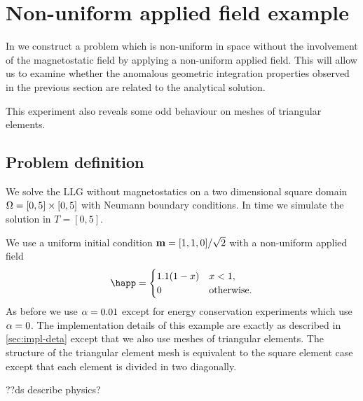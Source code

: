 \FloatBarrier
\section{Non-uniform applied field example}
\label{sec:non-uniform-applied}

In  we construct a problem which is non-uniform in space without the involvement of the magnetostatic field by applying a non-uniform applied field.
This will allow us to examine whether the anomalous geometric integration properties observed in the previous section are related to the analytical solution.

This experiment also reveals some odd behaviour on meshes of triangular elements.

\subsection{Problem definition}

We solve the LLG without magnetostatics on a two dimensional square domain $\Omega = [0,5] \times [0,5]$ with Neumann boundary conditions.
In time we simulate the solution in $T = [0, 5]$.

We use a uniform initial condition $\boldsymbol{\mathrm{m}} = [1, 1, 0]/\sqrt{2}$ with a non-uniform applied field
\begin{equation}
  \happ =
  \begin{cases}
    1.1 (1 -  x) & x  < 1, \\
    0 & \mathrm{otherwise}.
  \end{cases}
\end{equation}
As before we use $\alpha = 0.01$ except for energy conservation experiments which use $\alpha = 0$.
The implementation details of this example are exactly as described in \cref{sec:impl-deta} except that we also use meshes of triangular elements.
The structure of the triangular element mesh is equivalent to the square element case except that each element is divided in two diagonally.

??ds describe physics?





